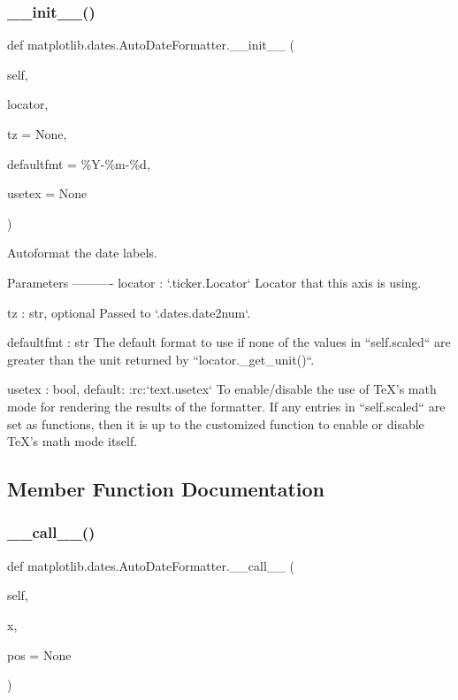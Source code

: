 \subsubsection{\texorpdfstring{\+\_\+\+\_\+init\+\_\+\+\_\+()}{\_\_init\_\_()}}
{\footnotesize\ttfamily def matplotlib.\+dates.\+Auto\+Date\+Formatter.\+\_\+\+\_\+init\+\_\+\+\_\+ (\begin{DoxyParamCaption}\item[{}]{self,  }\item[{}]{locator,  }\item[{}]{tz = {\ttfamily None},  }\item[{}]{defaultfmt = {\ttfamily \textquotesingle{}\%Y-\/\%m-\/\%d\textquotesingle{}},  }\item[{}]{usetex = {\ttfamily None} }\end{DoxyParamCaption})}

\begin{DoxyVerb}Autoformat the date labels.

Parameters
----------
locator : `.ticker.Locator`
    Locator that this axis is using.

tz : str, optional
    Passed to `.dates.date2num`.

defaultfmt : str
    The default format to use if none of the values in ``self.scaled``
    are greater than the unit returned by ``locator._get_unit()``.

usetex : bool, default: :rc:`text.usetex`
    To enable/disable the use of TeX's math mode for rendering the
    results of the formatter. If any entries in ``self.scaled`` are set
    as functions, then it is up to the customized function to enable or
    disable TeX's math mode itself.
\end{DoxyVerb}
 

\subsection{Member Function Documentation}
\mbox{\label{classmatplotlib_1_1dates_1_1AutoDateFormatter_a8f033a6cb87d8c33bd7224ea9901a632}} 
\subsubsection{\texorpdfstring{\+\_\+\+\_\+call\+\_\+\+\_\+()}{\_\_call\_\_()}}
{\footnotesize\ttfamily def matplotlib.\+dates.\+Auto\+Date\+Formatter.\+\_\+\+\_\+call\+\_\+\+\_\+ (\begin{DoxyParamCaption}\item[{}]{self,  }\item[{}]{x,  }\item[{}]{pos = {\ttfamily None} }\end{DoxyParamCaption})}



